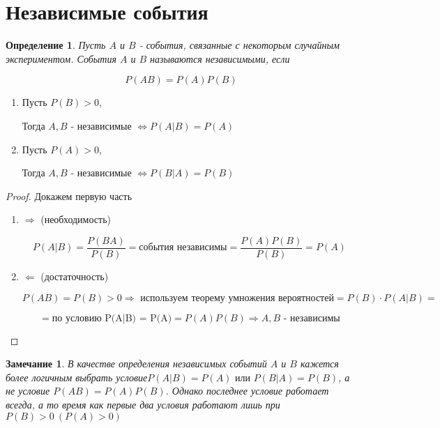 \documentclass[a4paper, 14pt]{report}
\newtheorem{defenition}{Определение}[section]
\newtheorem{note}{Замечание}[section]
\begin{document}
\section{Независимые события}

\begin{defenition}
    Пусть $A$ и $B$ - события, связанные с некоторым случайным экспериментом. События $A$ и $B$ называются независимыми, если

    $$
    P(AB) = P(A)P(B)
    $$
\end{defenition}

\begin{theorem}
    \hfill

    \begin{enumerate}
        \item Пусть $P(B) > 0$,

            Тогда $A,B$ - независимые $\Leftrightarrow P(A|B) = P(A)$

        \item Пусть $P(A) > 0$,

            Тогда $A,B$ - независимые $\Leftrightarrow P(B|A) = P(B)$
    \end{enumerate}
\end{theorem}

\begin{proof}
    Докажем первую часть

    \begin{enumerate}
        \item $\Rightarrow$ (необходимость)

            $$
            P(A|B) = \frac{P(BA)}{P(B)} = \text{события независимы} = \frac{P(A)P(B)}{P(B)} = P(A)
            $$

        \item $\Leftarrow$ (достаточность)

            $$
            P(AB) = P(B) > 0 \Rightarrow \text{ используем теорему умножения вероятностей} = P(B) \cdot P(A|B) = 
            $$

            $$
            = \text{по условию P(A|B) = P(A)} = P(A)P(B) \Rightarrow A,B \text{ - независимы}
            $$
    \end{enumerate}
\end{proof}

\begin{note}
    В качестве определения независимых событий $A$ и $B$ кажется более логичным выбрать условие$P(A|B) = P(A) \text{ или } P(B|A) = P(B)$, а не условие  $P(AB) = P(A)P(B)$. Однако последнее условие работает всегда, а то время как первые два условия работают лишь при $P(B) > 0\ (P(A) > 0)$
\end{note}
\end{document}
